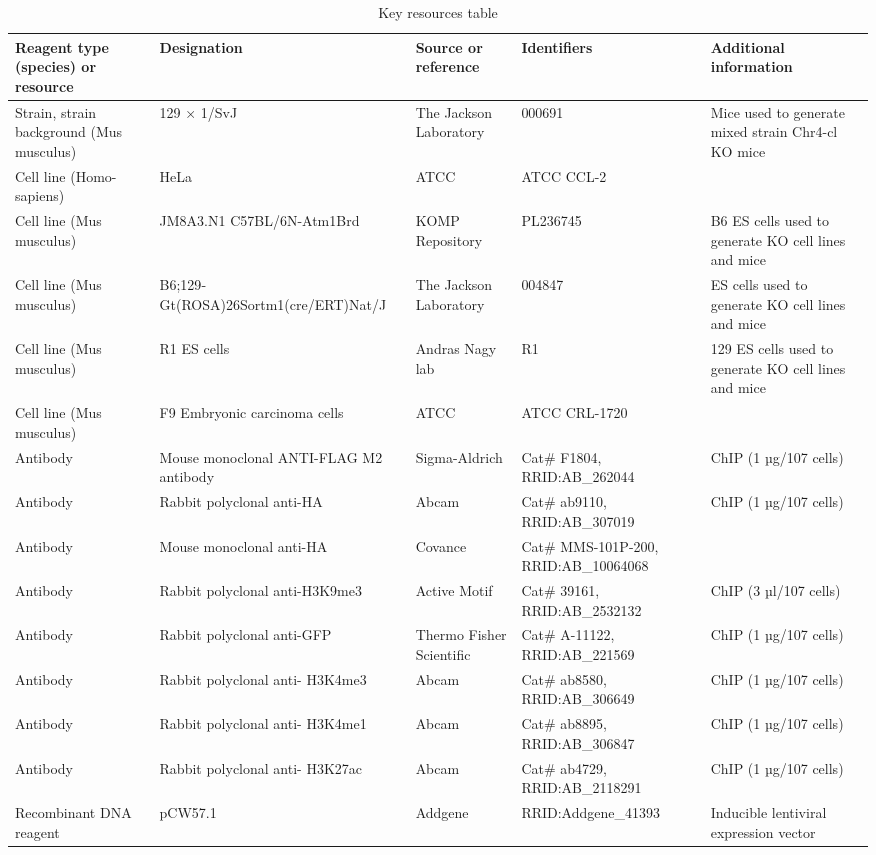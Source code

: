 \documentclass[11pt,a4paper]{article}
\begin{document}
\begin{table}[h]
\caption{Key resources table}
\begin{tabular}{|l|l|l|l|l|}
\hline
Reagent type (species) or resource & Designation & Source or reference & Identifiers & Additional information \\ \hline
Strain, strain background (Mus musculus) & 129 × 1/SvJ & The Jackson Laboratory & 000691 & Mice used to generate mixed strain Chr4-cl KO mice \\ \hline
Cell line (Homo-sapiens) & HeLa & ATCC & ATCC CCL-2 &  \\ \hline
Cell line (Mus musculus) & JM8A3.N1 C57BL/6N-Atm1Brd & KOMP Repository & PL236745 & B6 ES cells used to generate KO cell lines and mice \\ \hline
Cell line (Mus musculus) & B6;129‐ Gt(ROSA)26Sortm1(cre/ERT)Nat/J & The Jackson Laboratory & 004847 & ES cells used to generate KO cell lines and mice \\ \hline
Cell line (Mus musculus) & R1 ES cells & Andras Nagy lab & R1 & 129 ES cells used to generate KO cell lines and mice \\ \hline
Cell line (Mus musculus) & F9 Embryonic carcinoma cells & ATCC & ATCC CRL-1720 &  \\ \hline
Antibody & Mouse monoclonal ANTI-FLAG M2 antibody & Sigma-Aldrich & Cat\# F1804, RRID:AB\_262044 & ChIP (1 µg/107 cells) \\ \hline
Antibody & Rabbit polyclonal anti-HA & Abcam & Cat\# ab9110, RRID:AB\_307019 & ChIP (1 µg/107 cells) \\ \hline
Antibody & Mouse monoclonal anti-HA & Covance & Cat\# MMS-101P-200, RRID:AB\_10064068 &  \\ \hline
Antibody & Rabbit polyclonal anti-H3K9me3 & Active Motif & Cat\# 39161, RRID:AB\_2532132 & ChIP (3 µl/107 cells) \\ \hline
Antibody & Rabbit polyclonal anti-GFP & Thermo Fisher Scientific & Cat\# A-11122, RRID:AB\_221569 & ChIP (1 µg/107 cells) \\ \hline
Antibody & Rabbit polyclonal anti- H3K4me3 & Abcam & Cat\# ab8580, RRID:AB\_306649 & ChIP (1 µg/107 cells) \\ \hline
Antibody & Rabbit polyclonal anti- H3K4me1 & Abcam & Cat\# ab8895, RRID:AB\_306847 & ChIP (1 µg/107 cells) \\ \hline
Antibody & Rabbit polyclonal anti- H3K27ac & Abcam & Cat\# ab4729, RRID:AB\_2118291 & ChIP (1 µg/107 cells) \\ \hline
Recombinant DNA reagent & pCW57.1 & Addgene & RRID:Addgene\_41393 & Inducible lentiviral expression vector \\ \hline

\end{tabular}
\end{table}
\end{document}
